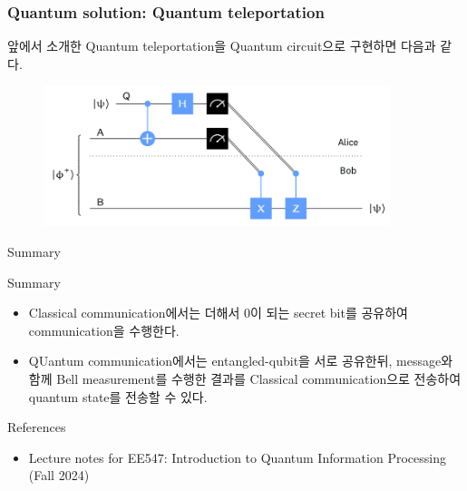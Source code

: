 \documentclass[9pt]{beamer}
\begin{document}
    \begin{frame}
        \frametitle{Quantum solution: Quantum teleportation}
        앞에서 소개한 Quantum teleportation을 Quantum circuit으로 구현하면 다음과 같다.
        \begin{figure}
            \centering
            \includegraphics[width=0.9\textwidth]{image/L5_quantum.png}
        \end{figure}
    
    \end{frame}
    \begin{frame}{Summary}
        \begin{block}{Summary}
            \begin{itemize}
                \item Classical communication에서는 더해서 0이 되는 secret bit를 공유하여 communication을 수행한다.
                \item QUantum communication에서는 entangled-qubit을 서로 공유한뒤, message와 함께 Bell measurement를 수행한 결과를 Classical communication으로 전송하여 quantum state를 전송할 수 있다.
            \end{itemize}
        \end{block}
    \end{frame}


    \begin{frame}{References}
        \begin{itemize}
            \item Lecture notes for EE547: Introduction to Quantum Information Processing (Fall 2024)
        \end{itemize}
        \vspace{6cm}
    \end{frame}
\end{document}
